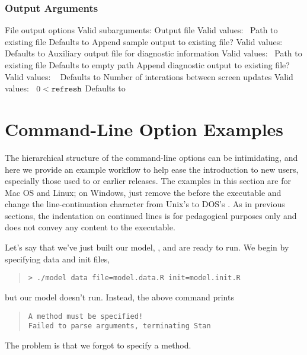 \subsubsection{Output Arguments}

\begin{description}
  {File output options}
  {Valid subarguments: }
%
    {Output file}
    {Valid values: \  Path to existing file}
    {Defaults to }
%
    {Append sample output to existing file?}
    {Valid values: \ }
    {Defaults to }
%
    {Auxiliary output file for diagnostic information}
    {Valid values: \  Path to existing file}
    {Defaults to empty path}
%
    {Append diagnostic output to existing file?}
    {Valid values: \ }
    {Defaults to }
%
    {Number of interations between screen updates}
    {Valid values: \  $0 < \mbox{\code{refresh}}$}
    {Defaults to }
%
\end{description}

\section{Command-Line Option Examples}

The hierarchical structure of the command-line options can be
intimidating, and here we provide an example workflow to help ease the
introduction to new users, especially those used to  or
earlier releases.  The examples in this section are for Mac OS and
Linux; on Windows, just remove the  before the executable and
change the line-continuation character from Unix's
\code{\textbackslash} to DOS's \code{\textasciicircum}.  As in
previous sections, the indentation on continued lines is for
pedagogical purposes only and does not convey any content to the
executable.

Let's say that we've just built our model, , and are ready to run.
We begin by specifying data and init files,
%
\begin{quote}
\begin{Verbatim}[fontshape=sl]
> ./model data file=model.data.R init=model.init.R
\end{Verbatim}
\end{quote}
%
but our model doesn't run.  Instead, the above command prints
%
\begin{quote}
\begin{Verbatim}
A method must be specified!
Failed to parse arguments, terminating Stan
\end{Verbatim}
\end{quote}
%
The problem is that we forgot to specify a method.

